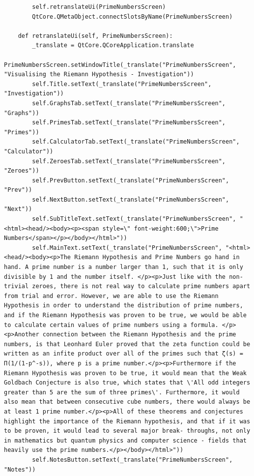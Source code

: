 \documentclass[12pt]{article}
\begin{document}
\begin{lstlisting}
        self.retranslateUi(PrimeNumbersScreen)
        QtCore.QMetaObject.connectSlotsByName(PrimeNumbersScreen)

    def retranslateUi(self, PrimeNumbersScreen):
        _translate = QtCore.QCoreApplication.translate
        PrimeNumbersScreen.setWindowTitle(_translate("PrimeNumbersScreen", "Visualising the Riemann Hypothesis - Investigation"))
        self.Title.setText(_translate("PrimeNumbersScreen", "Investigation"))
        self.GraphsTab.setText(_translate("PrimeNumbersScreen", "Graphs"))
        self.PrimesTab.setText(_translate("PrimeNumbersScreen", "Primes"))
        self.CalculatorTab.setText(_translate("PrimeNumbersScreen", "Calculator"))
        self.ZeroesTab.setText(_translate("PrimeNumbersScreen", "Zeroes"))
        self.PrevButton.setText(_translate("PrimeNumbersScreen", "Prev"))
        self.NextButton.setText(_translate("PrimeNumbersScreen", "Next"))
        self.SubTitleText.setText(_translate("PrimeNumbersScreen", "<html><head/><body><p><span style=\" font-weight:600;\">Prime Numbers</span></p></body></html>"))
        self.MainText.setText(_translate("PrimeNumbersScreen", "<html><head/><body><p>The Riemann Hypothesis and Prime Numbers go hand in hand. A prime number is a number larger than 1, such that it is only divisible by 1 and the number itself. </p><p>Just like with the non-trivial zeroes, there is not real way to calculate prime numbers apart from trial and error. However, we are able to use the Riemann Hypothesis in order to understand the distribution of prime numbers, and if the Riemann Hypothesis was proven to be true, we would be able to calculate certain values of prime numbers using a formula. </p><p>Another connection between the Riemann Hypothesis and the prime numbers, is that Leonhard Euler proved that the zeta function could be written as an infite product over all of the primes such that ζ(s) = Π(1/(1-p^-s)), where p is a prime number.</p><p>Furthermore if the Riemann Hypothesis was proven to be true, it would mean that the Weak Goldbach Conjecture is also true, which states that \'All odd integers greater than 5 are the sum of three primes\'. Furthermore, it would also mean that between consecutive cube numbers, there would always be at least 1 prime number.</p><p>All of these theorems and conjectures highlight the importance of the Riemann hypothesis, and that if it was to be proven, it would lead to several major break- throughs, not only in mathematics but quantum physics and computer science - fields that heavily use the prime numbers.</p></body></html>"))
        self.NotesButton.setText(_translate("PrimeNumbersScreen", "Notes"))
\end{lstlisting}
\end{document}
